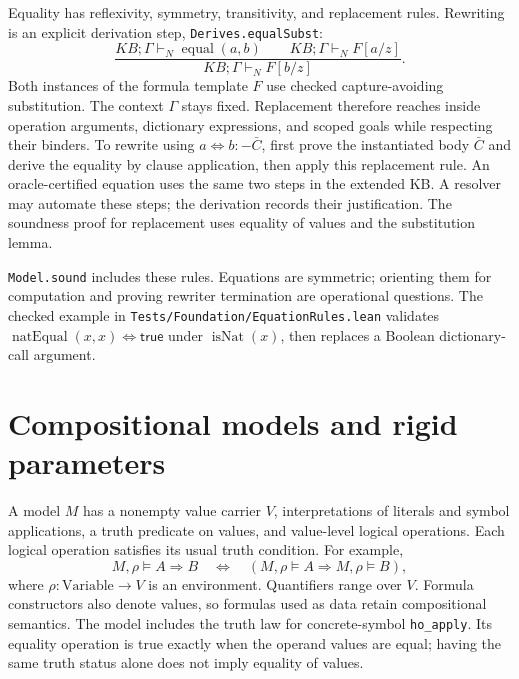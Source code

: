 \documentclass[11pt]{article}
\newcommand{\KB}{\mathit{KB}}
\begin{document}
Equality has reflexivity, symmetry, transitivity, and replacement rules.
Rewriting is an explicit derivation step, \texttt{Derives.equalSubst}:
\[
 \frac{\KB;\Gamma\vdash_N\operatorname{equal}(a,b)
       \qquad\KB;\Gamma\vdash_N F[a/z]}
      {\KB;\Gamma\vdash_N F[b/z]}.
\]
Both instances of the formula template $F$ use checked capture-avoiding
substitution. The context $\Gamma$ stays fixed. Replacement therefore reaches
inside operation arguments, dictionary expressions, and scoped goals while
respecting their binders. To rewrite using
$a\mathrel{\Leftrightarrow}b\mathbin{:-}\bar C$, first prove the instantiated
body $\bar C$ and derive the equality by clause application, then apply this
replacement rule. An oracle-certified equation uses the same two steps in the
extended KB. A resolver may automate these steps; the derivation records their
justification. The soundness proof for replacement uses equality of values and
the substitution lemma.

\texttt{Model.sound} includes these rules. Equations are symmetric; orienting
them for computation and proving rewriter termination are operational questions.
The checked example in \texttt{Tests/Foundation/EquationRules.lean} validates
$\operatorname{natEqual}(x,x)\Leftrightarrow\mathsf{true}$ under
$\operatorname{isNat}(x)$, then replaces a Boolean dictionary-call argument.

\section{Compositional models and rigid parameters}
A model $M$ has a nonempty value carrier $V$, interpretations of literals and
symbol applications, a truth predicate on values, and value-level logical
operations. Each logical operation satisfies its usual truth condition. For example,
\[
 M,\rho\models A\Rightarrow B
 \quad\Longleftrightarrow\quad
 (M,\rho\models A\Rightarrow M,\rho\models B),
\]
where $\rho:\mathrm{Variable}\to V$ is an environment. Quantifiers range over
$V$. Formula constructors also denote values, so formulas used as data retain
compositional semantics. The model includes the truth law for concrete-symbol
\texttt{ho\_apply}.
Its equality operation is true exactly when the operand values are equal;
having the same truth status alone does not imply equality of values.
\end{document}
